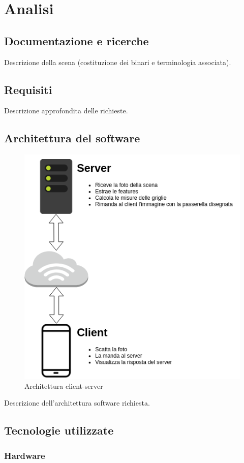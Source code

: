 \documentclass[twoside]{supsistudent}
\begin{document}
\chapter{Analisi}
\section{Documentazione e ricerche}
Descrizione della scena (costituzione dei binari e terminologia associata). 
\section{Requisiti}
Descrizione approfondita delle richieste.
\section{Architettura del software}
\begin{figure}[H]
  \center
  \includegraphics[scale=0.6]{images/Architettura.png}
  \caption{Architettura client-server}
\end{figure}
Descrizione dell'architettura software richiesta.
\section{Tecnologie utilizzate}
\subsection{Hardware}
\end{document}
